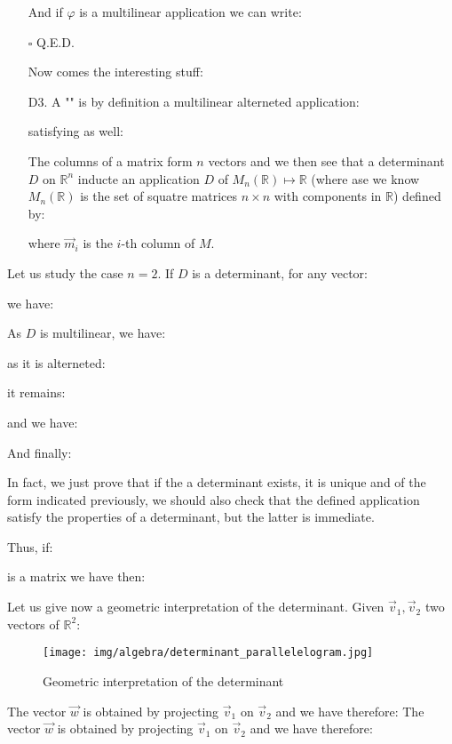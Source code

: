 \begin{enumerate}
\begin{dem}
		And if $\varphi$ is a multilinear application we can write:
		
		\begin{flushright}
			$\square$  Q.E.D.
		\end{flushright}
		\end{dem}
		Now comes the interesting stuff:
		
		\item[D3.]  A "" is by definition a multilinear alterneted application:
		
		satisfying as well:
		
		\begin{tcolorbox}[title=Remark,colframe=black,arc=10pt]
		The columns of a matrix form $n$ vectors and we then see that a determinant $D$ on $\mathbb{R}^n$ inducte an application $D$ of $M_n(\mathbb{R})\mapsto \mathbb{R}$ (where ase we know $M_n(\mathbb{R})$ is the set of squatre matrices $n\times n$ with components in $\mathbb{R}$) defined by:
		
		where $\vec{m}_i$ is the $i$-th column of $M$. 
		\end{tcolorbox}	
	\end{enumerate}
	Let us study the case $n=2$. If $D$ is a determinant, for any vector:
	
	we have:
	
	As $D$ is multilinear, we have:
	
	as it is alterneted:
	
	it remains:
	
	and we have:
	
	And finally:
	
	In fact, we just prove that if the a determinant exists, it is unique and of the form indicated previously, we should also check that the defined application satisfy the properties of a determinant, but the latter is immediate.
	
	Thus, if:
	
	is a matrix we have then:
	
	Let us give now a geometric interpretation of the determinant. Given $\vec{v}_1,\vec{v}_2$ two vectors of $\mathbb{R}^2$:
	\begin{figure}[H]
		\centering
		\texttt{[image: img/algebra/determinant\_parallelelogram.jpg]}
		\caption{Geometric interpretation of the determinant}
	\end{figure}
	The vector $\vec{w}$ is obtained by projecting $\vec{v}_1$ on $\vec{v}_2$ and we have therefore:
	The vector $\vec{w}$ is obtained by projecting $\vec{v}_1$ on $\vec{v}_2$ and we have therefore:
	
